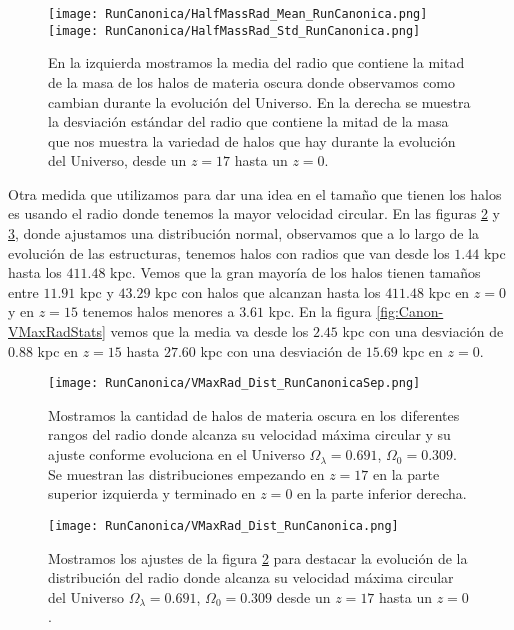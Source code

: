 \begin{figure}[H]
    \centering
    \texttt{[image: RunCanonica/HalfMassRad\_Mean\_RunCanonica.png]}
    \texttt{[image: RunCanonica/HalfMassRad\_Std\_RunCanonica.png]}
    \caption[Media y desviación estándar del radio de la mitad de la masa]{\footnotesize En la izquierda mostramos la media del radio que contiene la mitad de la masa de los halos de materia oscura donde observamos como cambian durante la evolución del Universo. En la derecha se muestra la desviación estándar del radio que contiene la mitad de la masa que nos muestra la variedad de halos que hay durante la evolución del Universo, desde un $z=17$ hasta un $z=0$.}
    \label{fig:Canon-HalfMassRadStats}
\end{figure}

Otra medida que utilizamos para dar una idea en el tamaño que tienen los halos es usando el radio donde tenemos la mayor velocidad circular. En las figuras \ref{fig:Canon-VMaxRadDistSep} y \ref{fig:Canon-VMaxRadDist}, donde ajustamos una distribución normal, observamos que a lo largo de la evolución de las estructuras, tenemos halos con radios que van desde los $1.44$ kpc hasta los $411.48$ kpc. Vemos que la gran mayoría de los halos tienen tamaños entre $11.91$ kpc y $43.29$ kpc con halos que alcanzan hasta los $411.48$ kpc en $z=0$ y en $z=15$ tenemos halos menores a $3.61$ kpc. En la figura \ref{fig:Canon-VMaxRadStats} vemos que la media va desde los $2.45$ kpc con una desviación de $0.88$ kpc en $z=15$ hasta $27.60$ kpc con una desviación de $15.69$ kpc en $z=0$.

\begin{figure}[H]
    \centering
    \texttt{[image: RunCanonica/VMaxRad\_Dist\_RunCanonicaSep.png]}
    \caption[Radio donde se alcanza la velocidad máxima circular]{\footnotesize Mostramos la cantidad de halos de materia oscura en los diferentes rangos del radio donde alcanza su velocidad máxima circular y su ajuste conforme evoluciona en el Universo $\Omega_\lambda = 0.691 $, $\Omega_0 = 0.309$. Se muestran las distribuciones empezando en $z=17$ en la parte superior izquierda y terminado en $z=0$ en la parte inferior derecha.}
    \label{fig:Canon-VMaxRadDistSep}
\end{figure}

\begin{figure}[H]
    \centering
    \texttt{[image: RunCanonica/VMaxRad\_Dist\_RunCanonica.png]}
    \caption[Distribución del radio donde se alcanza la velocidad máxima circular]{\footnotesize Mostramos los ajustes de la figura \ref{fig:Canon-VMaxRadDistSep} para destacar la evolución de la distribución del radio donde alcanza su velocidad máxima circular del Universo $\Omega_\lambda = 0.691 $, $\Omega_0 = 0.309$ desde un $z=17$ hasta un $z=0$.}
    \label{fig:Canon-VMaxRadDist}
\end{figure}


